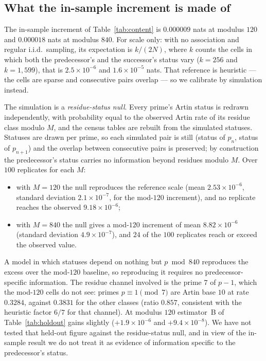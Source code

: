 \subsection*{What the in-sample increment is made of}
The in-sample increment of Table~\ref{tab:content} is $0.000009$ nats at modulus $120$ and
$0.000018$ nats at modulus $840$. For scale only: with no association and regular i.i.d.\
sampling, its expectation is $k/(2N)$, where $k$ counts the cells in which both the
predecessor's and the successor's status vary ($k=256$ and $k=1{,}599$), that is
$2.5\times10^{-6}$ and $1.6\times10^{-5}$ nats. That reference is heuristic --- the cells are
sparse and consecutive pairs overlap --- so we calibrate by simulation instead.

The simulation is a \emph{residue-status null}. Every prime's Artin status is redrawn
independently, with probability equal to the observed Artin rate of its residue class modulo
$M$, and the census tables are rebuilt from the simulated statuses. Statuses are drawn per
prime, so each simulated pair is still (status of $p_n$, status of $p_{n+1}$) and the overlap
between consecutive pairs is preserved; by construction the predecessor's status carries no
information beyond residues modulo $M$. Over $100$ replicates for each $M$:
\begin{itemize}
	\item with $M=120$ the null reproduces the reference scale (mean $2.53\times10^{-6}$, standard
	deviation $2.1\times10^{-7}$, for the mod-$120$ increment), and no replicate reaches the
	observed $9.18\times10^{-6}$;
	\item with $M=840$ the null gives a mod-$120$ increment of mean $8.82\times10^{-6}$ (standard
	deviation $4.9\times10^{-7}$), and $24$ of the $100$ replicates reach or exceed the observed value.
\end{itemize}
A model in which statuses depend on nothing but $p \bmod 840$ reproduces the excess over the
mod-$120$ baseline, so reproducing it requires no predecessor-specific information. The residue channel involved is the
prime $7$ of $p-1$, which the mod-$120$ cells do not see: primes $p\equiv 1 \pmod 7$ are Artin
base $10$ at rate $0.3284$, against $0.3831$ for the other classes (ratio $0.857$, consistent with
the heuristic factor $6/7$ for that channel). At modulus $120$ estimator~B of
Table~\ref{tab:holdout} gains slightly ($+1.9\times10^{-6}$ and $+9.4\times10^{-8}$). We have not
tested that held-out figure against the residue-status null, and in view of the in-sample result
we do not treat it as evidence of information specific to the predecessor's status.

